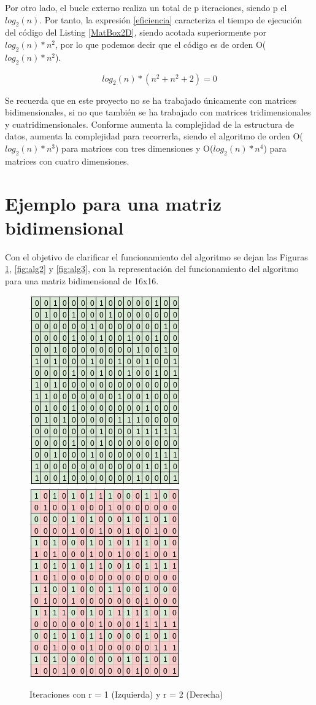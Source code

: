 Por otro lado, el bucle externo realiza un total de p iteraciones, siendo p el $log_2(n)$. Por tanto, la expresión \ref{eficiencia} caracteriza el tiempo de ejecución del código del Listing \ref{MatBox2D}, siendo acotada superiormente por $log_2(n)*n^2$, por lo que podemos decir que el código es de orden O( $log_2(n)*n^2$). 

\begin{equation}
    \label{eficiencia}
    log_2(n)*(n^2 + n^2 + 2) = 0
\end{equation}

Se recuerda que en este proyecto no se ha trabajado únicamente con matrices bidimensionales, si no que también se ha trabajado con matrices tridimensionales y cuatridimensionales. Conforme aumenta la complejidad de la estructura de datos, aumenta la complejidad para recorrerla, siendo el algoritmo de orden O($log_2(n)*n^3$) para matrices con tres dimensiones y O($log_2(n)*n^4$) para matrices con cuatro dimensiones.
\section{Ejemplo para una matriz bidimensional}
Con el objetivo de clarificar el funcionamiento del algoritmo se dejan las Figuras \ref{fig:alg1}, \ref{fig:alg2} y \ref{fig:alg3}, con la representación del funcionamiento del algoritmo para una matriz bidimensional de 16x16.

\begin{figure}[H]
    \centering
    \includegraphics[width=.24\textwidth]{img/ejemploAlgoritmo1.jpeg}
    \includegraphics[width=.24\textwidth]{img/ejemploAlgoritmo2.jpeg}
    \caption{Iteraciones con r = 1 (Izquierda) y r = 2 (Derecha)}
    \label{fig:alg1}
\end{figure}

